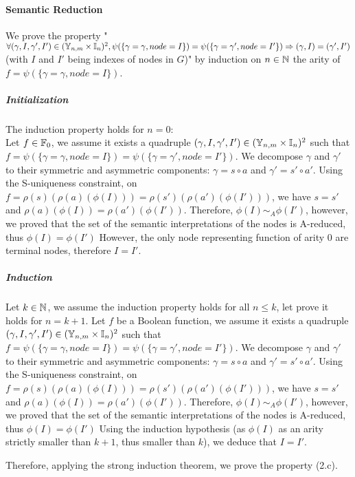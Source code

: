 \documentclass[a4paper,10pt]{article}
\begin{document}
\paragraph{Semantic Reduction}
We prove the property "$\forall (\gamma, I, \gamma', I') \in (\mathbb{Y}_{n, m} \times \mathbb{I}_n)^2, \psi(\{\gamma = \gamma, node = I\}) = \psi(\{\gamma = \gamma', node = I'\}) \Rightarrow (\gamma, I) = (\gamma', I')$ (with $I$ and $I'$ being indexes of nodes in $G$)" by induction on $n\in\mathbb{N}$ the arity of $f = \psi(\{\gamma = \gamma, node = I\})$.

\subparagraph{Initialization}
The induction property holds for $n = 0$:\\
Let $f\in\mathbb{F}_0$, we assume it exists a quadruple $(\gamma, I, \gamma', I') \in (\mathbb{Y}_{n, m} \times \mathbb{I}_n)^2$ such that $f = \psi(\{\gamma = \gamma, node = I\}) = \psi(\{\gamma = \gamma', node = I'\})$.
We decompose $\gamma$ and $\gamma'$ to their symmetric and asymmetric components: $\gamma = s \circ a$ and $\gamma' = s' \circ a'$.
Using the S-uniqueness constraint, on $f = \rho(s)(\rho(a)(\phi(I))) = \rho(s')(\rho(a')(\phi(I')))$, we have $s = s'$ and $\rho(a)(\phi(I)) = \rho(a')(\phi(I'))$.
Therefore, $\phi(I) \sim_A \phi(I')$, however, we proved that the set of the semantic interpretations of the nodes is A-reduced, thus $\phi(I) = \phi(I')$
However, the only node representing function of arity 0 are terminal nodes, therefore $I = I'$.

\subparagraph{Induction}
Let $k\in\mathbb{N}$, we assume the induction property holds for all $n\leq k$, let prove it holds for $n = k+1$.
Let $f$ be a Boolean function, we assume it exists a quadruple $(\gamma, I, \gamma', I') \in (\mathbb{Y}_{n, m} \times \mathbb{I}_n)^2$ such that $f = \psi(\{\gamma = \gamma, node = I\}) = \psi(\{\gamma = \gamma', node = I'\})$.
We decompose $\gamma$ and $\gamma'$ to their symmetric and asymmetric components: $\gamma = s \circ a$ and $\gamma' = s' \circ a'$.
Using the S-uniqueness constraint, on $f = \rho(s)(\rho(a)(\phi(I))) = \rho(s')(\rho(a')(\phi(I')))$, we have $s = s'$ and $\rho(a)(\phi(I)) = \rho(a')(\phi(I'))$.
Therefore, $\phi(I) \sim_A \phi(I')$, however, we proved that the set of the semantic interpretations of the nodes is A-reduced, thus $\phi(I) = \phi(I')$
Using the induction hypothesis (as $\phi(I)$ as an arity strictly smaller than $k+1$, thus smaller than $k$), we deduce that $I = I'$.

Therefore, applying the strong induction theorem, we prove the property (2.c).
\end{document}

